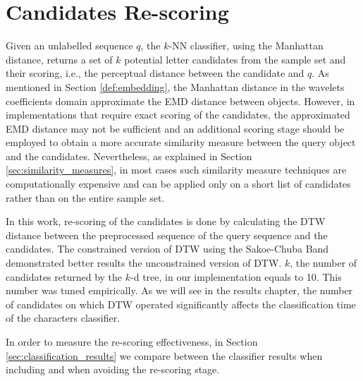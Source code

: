 \newpage{}

\section{Candidates Re-scoring}
\label{sec:candidates_scoring}
\iftoggle{edit-mode}{\hspace{0pt}\marginpar{The need for a re-scoring}}{} 
Given an unlabelled sequence $q$, the $k$-NN classifier, using the Manhattan distance, returns a set of $k$ potential letter candidates from the sample set and their scoring, i.e., the perceptual distance between the candidate and $q$.
As mentioned in Section \ref{def:embedding}, the Manhattan distance in the wavelets coefficients domain approximate the EMD distance between objects. 
However, in implementations that require exact scoring of the candidates, the approximated EMD distance may not be sufficient and an additional scoring stage should be employed to obtain a more accurate similarity measure between the query object and the candidates.
Nevertheless, as explained in Section \ref{sec:similarity_measures}, in most cases such similarity measure techniques are computationally expensive and can be applied only on a short list of candidates rather than on the entire sample set.   

\iftoggle{edit-mode}{\hspace{0pt}\marginpar{How re-scoring is done here}}{} 
In this work, re-scoring of the candidates is done by calculating the DTW distance between the preprocessed sequence of the query sequence and the candidates.
The constrained version of DTW using the Sakoe-Chuba Band \cite{sakoe1978dynamic} demonstrated better results the unconstrained version of DTW.
$k$, the number of candidates returned by the $k$-d tree, in our implementation equals to 10.
This number was tuned empirically.
As we will see in the results chapter, the number of candidates on which DTW operated significantly affects the classification time of the characters classifier.

\iftoggle{edit-mode}{\hspace{0pt}\marginpar{Re-scoring Effectiveness}}{} 
In order to measure the re-scoring effectiveness, in Section \ref{sec:classification_results} we compare between the classifier results when including and when avoiding the re-scoring stage.

\newpage{}

